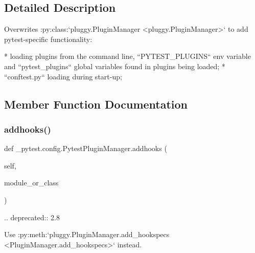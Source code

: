 \subsection{Detailed Description}
\begin{DoxyVerb}Overwrites :py:class:`pluggy.PluginManager <pluggy.PluginManager>` to add pytest-specific
functionality:

* loading plugins from the command line, ``PYTEST_PLUGINS`` env variable and
  ``pytest_plugins`` global variables found in plugins being loaded;
* ``conftest.py`` loading during start-up;
\end{DoxyVerb}
 

\subsection{Member Function Documentation}
\mbox{\label{class__pytest_1_1config_1_1_pytest_plugin_manager_a2f8dbbdb244922fa7a8e9cab22b2c7e5}} 
\subsubsection{\texorpdfstring{addhooks()}{addhooks()}}
{\footnotesize\ttfamily def \+\_\+pytest.\+config.\+Pytest\+Plugin\+Manager.\+addhooks (\begin{DoxyParamCaption}\item[{}]{self,  }\item[{}]{module\+\_\+or\+\_\+class }\end{DoxyParamCaption})}

\begin{DoxyVerb}.. deprecated:: 2.8

Use :py:meth:`pluggy.PluginManager.add_hookspecs <PluginManager.add_hookspecs>`
instead.
\end{DoxyVerb}
 \mbox{\label{class__pytest_1_1config_1_1_pytest_plugin_manager_a4d3df6b285ba52ee06aa2009d7b94077}} 
